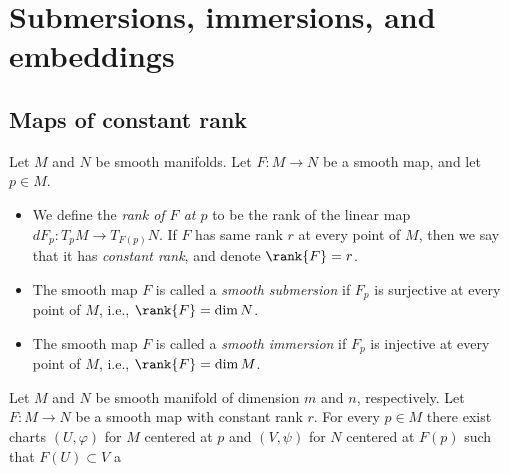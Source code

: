 
\chapter{Submersions, immersions, and embeddings}

\section{Maps of constant rank}

\begin{definition}
    Let $M$ and $N$ be smooth manifolds. Let $F : M \to N$ be a smooth map, and let $p \in M$.
    \begin{itemize}
        \item We define the \emph{rank of $F$ at $p$} to be the rank of the linear map $dF_p : T_pM \to T_{F(p)}N$. If $F$ has same rank $r$ at every point of $M$, then we say that it has \emph{constant rank}, and denote $\rank{F} = r$.
        \item The smooth map $F$ is called a \emph{smooth submersion} if $F_p$ is surjective at every point of $M$, i.e., $\rank{F} = \dim{N}$.
        \item The smooth map $F$ is called a \emph{smooth immersion} if $F_p$ is injective at every point of $M$, i.e., $\rank{F} = \dim{M}$.
    \end{itemize}
\end{definition}

\begin{theorem}
    Let $M$ and $N$ be smooth manifold of dimension $m$ and $n$, respectively. Let $F : M \to N$ be a smooth map with constant rank $r$. For every $p \in M$ there exist charts $(U, \varphi)$ for $M$ centered at $p$ and $(V, \psi)$ for $N$ centered at $F(p)$ such that $F(U) \subset V$ a
\end{theorem}




